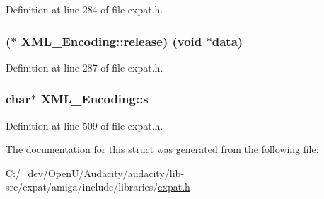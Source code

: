 Definition at line 284 of file expat.\+h.

\subsubsection[{\texorpdfstring{release}{release}}]{($\ast$ X\+M\+L\+\_\+\+Encoding\+::release) ({\bf void} $\ast${\bf data})}\hypertarget{struct_x_m_l___encoding_a0fc52048916349f611a96d2be907c75e}{}\label{struct_x_m_l___encoding_a0fc52048916349f611a96d2be907c75e}


Definition at line 287 of file expat.\+h.

\subsubsection[{\texorpdfstring{s}{s}}]{ char$\ast$ X\+M\+L\+\_\+\+Encoding\+::s}\hypertarget{struct_x_m_l___encoding_a71954164de94d278141718e5e80771ae}{}\label{struct_x_m_l___encoding_a71954164de94d278141718e5e80771ae}


Definition at line 509 of file expat.\+h.



The documentation for this struct was generated from the following file\+:\begin{DoxyCompactItemize}
\item 
C\+:/\+\_\+dev/\+Open\+U/\+Audacity/audacity/lib-\/src/expat/amiga/include/libraries/\hyperlink{amiga_2include_2libraries_2expat_8h}{expat.\+h}\end{DoxyCompactItemize}
